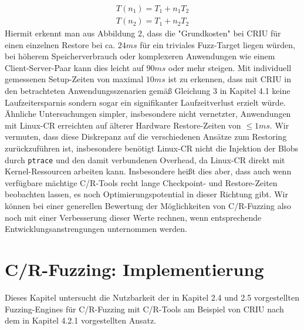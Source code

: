 \documentclass[a4paper]{article}
\begin{document}
\begin{equation}
    \begin{split}
    T(n_1) = T_1 + n_1 T_2 \\
    T(n_2) = T_1 + n_2 T_2
    \end{split}
\end{equation}
Hiermit erkennt man aus Abbildung 2, dass die "Grundkosten" bei CRIU für einen einzelnen Restore bei ca. $24ms$ für ein triviales Fuzz-Target liegen würden, bei höherem Speicherverbrauch oder komplexeren Anwendungen wie einem Client-Server-Paar kann dies leicht auf $90ms$ oder mehr steigen. 
Mit individuell gemessenen Setup-Zeiten von maximal $10{ms}$ ist zu erkennen, dass mit CRIU in den betrachteten Anwendungsszenarien gemäß Gleichung 3 in Kapitel 4.1 keine Laufzeitersparnis sondern sogar ein signifikanter Laufzeitverlust erzielt würde.\\ %
Ähnliche Untersuchungen simpler, insbesondere nicht vernetzter, Anwendungen mit Linux-CR\cite{linuxcr} erreichten auf älterer Hardware Restore-Zeiten von $\leq 1{ms}$. 
Wir vermuten, dass diese Diskrepanz auf die verschiedenen Ansätze zum Restoring zurückzuführen ist, insbesondere benötigt Linux-CR nicht die Injektion der Blobs durch \texttt{ptrace} und den damit verbundenen Overhead, da Linux-CR direkt mit Kernel-Ressourcen arbeiten kann. 
Insbesondere heißt dies aber, dass auch wenn verfügbare mächtige C/R-Tools recht lange Checkpoint- und Restore-Zeiten beobachten lassen, es noch Optimierungspotential in dieser Richtung gibt.
Wir können bei einer generellen Bewertung der Möglichkeiten von C/R-Fuzzing also noch mit einer Verbesserung dieser Werte rechnen, wenn entsprechende Entwicklungsanstrengungen unternommen werden.

\section{C/R-Fuzzing: Implementierung}
Dieses Kapitel untersucht die Nutzbarkeit der in Kapitel 2.4 und 2.5 vorgestellten Fuzzing-Engines für C/R-Fuzzing mit C/R-Tools am Beispiel von CRIU nach dem in Kapitel 4.2.1 vorgestellten Ansatz. %
\end{document}
